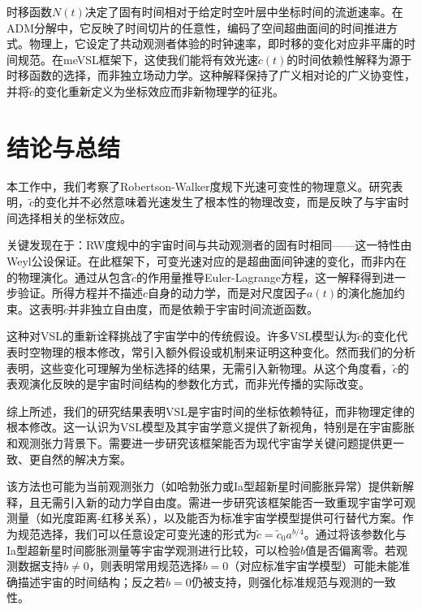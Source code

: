 \documentclass[jkps,preprint,fleqn]{revtex4}
\newcommand{\tc}{\tilde{c}}
\begin{document}
时移函数$N(t)$决定了固有时间相对于给定时空叶层中坐标时间的流逝速率。在ADM分解中，它反映了时间切片的任意性，编码了空间超曲面间的时间推进方式。物理上，它设定了共动观测者体验的时钟速率，即时移的变化对应非平庸的时间规范。在meVSL框架下，这使我们能将有效光速$\tc(t)$的时间依赖性解释为源于时移函数的选择，而非独立场动力学。这种解释保持了广义相对论的广义协变性，并将$\tc$的变化重新定义为坐标效应而非新物理学的征兆。
\section{结论与总结}\label{sec:Conc}
本工作中，我们考察了Robertson-Walker度规下光速可变性的物理意义。研究表明，$\tc$的变化并不必然意味着光速发生了根本性的物理改变，而是反映了与宇宙时间选择相关的坐标效应。

关键发现在于：RW度规中的宇宙时间与共动观测者的固有时相同——这一特性由Weyl公设保证。在此框架下，可变光速对应的是超曲面间钟速的变化，而非内在的物理演化。通过从包含$\tc$的作用量推导Euler-Lagrange方程，这一解释得到进一步验证。所得方程并不描述$c$自身的动力学，而是对尺度因子$a(t)$的演化施加约束。这表明$\tc$并非独立自由度，而是依赖于宇宙时间流逝函数。

这种对VSL的重新诠释挑战了宇宙学中的传统假设。许多VSL模型认为$\tc$的变化代表时空物理的根本修改，常引入额外假设或机制来证明这种变化。然而我们的分析表明，这些变化可理解为坐标选择的结果，无需引入新物理。从这个角度看，$\tc$的表观演化反映的是宇宙时间结构的参数化方式，而非光传播的实际改变。

综上所述，我们的研究结果表明VSL是宇宙时间的坐标依赖特征，而非物理定律的根本修改。这一认识为VSL模型及其宇宙学意义提供了新视角，特别是在宇宙膨胀和观测张力背景下。需要进一步研究该框架能否为现代宇宙学关键问题提供更一致、更自然的解决方案。

该方法也可能为当前观测张力（如哈勃张力或Ia型超新星时间膨胀异常）提供新解释，且无需引入新的动力学自由度。需进一步研究该框架能否一致重现宇宙学可观测量（如光度距离-红移关系），以及能否为标准宇宙学模型提供可行替代方案。作为规范选择，我们可以任意设定可变光速的形式为$\tc = \tc_0 a^{b/4}$。通过将该参数化与Ia型超新星时间膨胀测量等宇宙学观测进行比较，可以检验$b$值是否偏离零。若观测数据支持$b \neq 0$，则表明常用规范选择$b = 0$（对应标准宇宙学模型）可能未能准确描述宇宙的时间结构；反之若$b = 0$仍被支持，则强化标准规范与观测的一致性。
\end{document}
